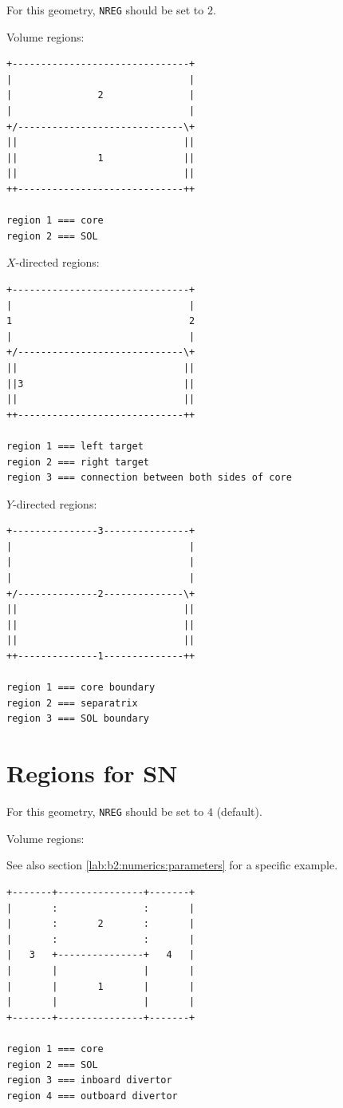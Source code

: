 \documentclass[a4paper,10pt]{report}
\begin{document}
For this geometry, {\tt NREG} should be set to $2$.

Volume regions:
\begin{verbatim}
+-------------------------------+
|                               |
|               2               |
|                               |
+/-----------------------------\+
||                             ||
||              1              ||
||                             ||
++-----------------------------++

region 1 === core
region 2 === SOL
\end{verbatim}

$X$-directed regions:
\begin{verbatim}
+-------------------------------+
|                               |
1                               2
|                               |
+/-----------------------------\+
||                             ||
||3                            ||
||                             ||
++-----------------------------++

region 1 === left target
region 2 === right target
region 3 === connection between both sides of core
\end{verbatim}

$Y$-directed regions:
\begin{verbatim}
+---------------3---------------+
|                               |
|                               |
|                               |
+/--------------2--------------\+
||                             ||
||                             ||
||                             ||
++--------------1--------------++

region 1 === core boundary
region 2 === separatrix
region 3 === SOL boundary
\end{verbatim}

\clearpage
\section{Regions for SN}

For this geometry, {\tt NREG} should be set to $4$ (default).

Volume regions:

See also section \ref{lab:b2:numerics:parameters} for a specific example.

\begin{verbatim}
+-------+---------------+-------+
|       :               :       |
|       :       2       :       |
|       :               :       |
|   3   +---------------+   4   |
|       |               |       |
|       |       1       |       |
|       |               |       |
+-------+---------------+-------+

region 1 === core
region 2 === SOL
region 3 === inboard divertor
region 4 === outboard divertor
\end{verbatim}
\end{document}
